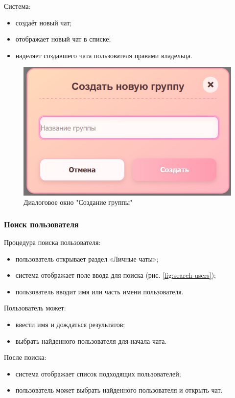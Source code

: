 Система:

\begin{itemize}		
\item создаёт новый чат;  
\item отображает новый чат в списке;
\item наделяет создавшего чата пользователя правами владельца.
\end{itemize}

\begin{figure}[!h]
	\centering
	\includegraphics[width=0.8\linewidth]{"images/Окно создания группы"}
	\caption{Диалоговое окно "Создание группы"}
	\label{fig:create-group}
\end{figure}

\subsubsection{Поиск пользователя}  
Процедура поиска пользователя:
\begin{itemize}
	\item пользователь открывает раздел «Личные чаты»;
	\item система отображает поле ввода для поиска (рис. \ref{fig:search-users});
	\item пользователь вводит имя или часть имени пользователя.
\end{itemize}

Пользователь может:
\begin{itemize}
	\item ввести имя и дождаться результатов;
	\item выбрать найденного пользователя для начала чата.
\end{itemize}

После поиска:
\begin{itemize}
	\item система отображает список подходящих пользователей;
	\item пользователь может выбрать найденного пользователя и открыть чат.
\end{itemize}


